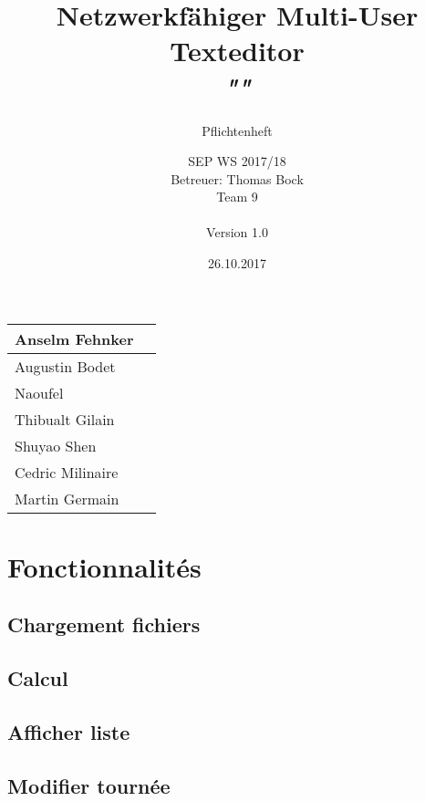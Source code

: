\documentclass{scrartcl}
\title{Netzwerkfähiger Multi-User Texteditor\\
\textit{"\name"}}
\subtitle{Pflichtenheft}
\author{SEP WS 2017/18\\
Betreuer: Thomas Bock\\
Team 9\\ \\
Version 1.0}
\date{26.10.2017}
\begin{document}
\maketitle

\iffalse
\begin{figure}[h]
	\centering
  \texttt{[image: ../img/insta\_logo]}
	\label{fig:logo}
\end{figure}
\fi
\vfill

\begin{center}
  \begin{tabular}{ | l | r | }
    \hline
    Anselm Fehnker \\ \hline
    Augustin Bodet  \\ \hline
    Naoufel \\ \hline
    Thibualt Gilain \\ \hline
    Shuyao Shen \\ \hline
    Cedric Milinaire\\ \hline
    Martin Germain \\ \hline
  \end{tabular}
\end{center}

\thispagestyle{empty}
\pagebreak
\renewcommand{\contentsname}{Table des matières}
\tableofcontents
\newpage

\section{Fonctionnalités}
\subsection{Chargement fichiers}
\subsection{Calcul}
\subsection{Afficher liste}
\subsection{Modifier tournée}
\end{document}
